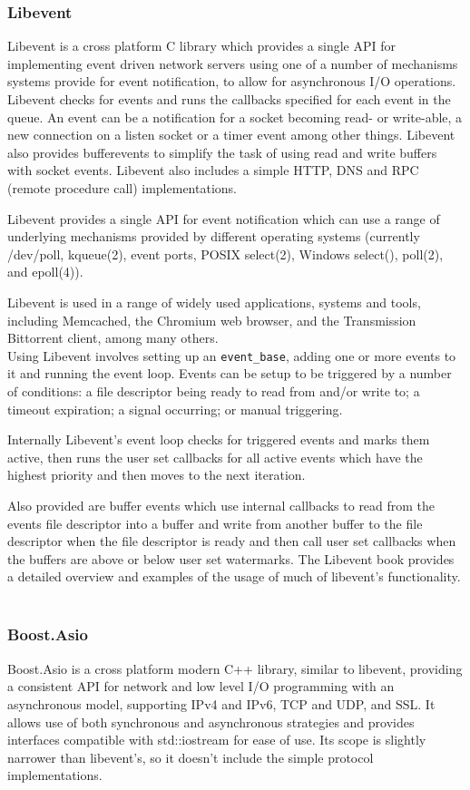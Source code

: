 \documentclass{article}
\begin{document}
\subsubsection{Libevent}
Libevent\cite{libevent} is a cross platform C library which provides a single API for implementing event driven network servers using one of a number of mechanisms systems provide for event notification, to allow for asynchronous I/O operations. Libevent checks for events and runs the callbacks specified for each event in the queue. An event can be a notification for a socket becoming read- or write-able, a new connection on a listen socket or a timer event among other things. Libevent also provides bufferevents to simplify the task of using read and write buffers with socket events. Libevent also includes a simple HTTP, DNS and RPC (remote procedure call) implementations.

Libevent provides a single API for event notification which can use a range of underlying mechanisms provided by different operating systems (currently /dev/poll, kqueue(2), event ports, POSIX select(2), Windows select(), poll(2), and epoll(4)).

Libevent is used in a range of widely used applications, systems and tools, including Memcached, the Chromium web browser, and the Transmission Bittorrent client, among many others.
\\
Using Libevent involves setting up an \texttt{event\_base}, adding one or more events to it and running the event loop. Events can be setup to be triggered by a number of conditions: a file descriptor being ready to read from and/or write to; a timeout expiration; a signal occurring; or manual triggering.

Internally Libevent's event loop checks for triggered events and marks them active, then runs the user set callbacks for all active events which have the highest priority and then moves to the next iteration.

Also provided are buffer events which use internal callbacks to read from the events file descriptor into a buffer and write from another buffer to the file descriptor when the file descriptor is ready and then call user set callbacks when the buffers are above or below user set watermarks.
The Libevent book\cite{libevent_book} provides a detailed overview and examples of the usage of much of libevent's functionality.
\\
\\

\subsubsection{Boost.Asio}
Boost.Asio\cite{basio} is a cross platform modern C++ library, similar to libevent, providing a consistent API for network and low level I/O programming with an asynchronous model, supporting IPv4 and IPv6, TCP and UDP, and SSL. It allows use of both synchronous and asynchronous strategies and provides interfaces compatible with std::iostream for ease of use.
Its scope is slightly narrower than libevent's, so it doesn't include the simple protocol implementations.
\end{document}
